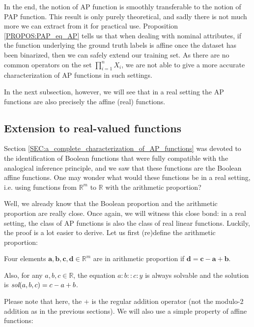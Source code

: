 In the end, the notion of AP function is smoothly transferable to the notion
of PAP function. This result is only purely theoretical, and sadly there is  
not much more we can extract from it for practical use. Proposition
\ref{PROPOS:PAP_eq_AP} tells us that when dealing with nominal attributes, if
the function underlying the ground truth labels is affine once the dataset has
been binarized, then we can safely extend our training set. As
there are no common operators on the set  $\prod_{i=1}^n X_i$, we are not able
to give a more accurate characterization of AP functions in such settings.

In the next subsection, however, we will see that in a real setting the AP
functions are also precisely the affine (real) functions.

\subsection{Extension to real-valued functions}
\label{SEC:extension_to_real_valued_functions}

Section \ref{SEC:a_complete_characterization_of_AP_functions} was devoted to the
identification of Boolean functions that were fully compatible with the
analogical inference principle, and we saw that
these functions are the Boolean affine functions. One may wonder what would
these functions be in a real setting, i.e. using functions  from $\mathbb{R}^m$
to $\mathbb{R}$ with the arithmetic proportion?

Well, we already know that the Boolean proportion and the arithmetic proportion
are really close. Once again, we will witness this close bond: in a real
setting, the class of AP functions is also the class of real linear functions.
Luckily, the proof is a lot easier to derive.  Let us first (re)define the
arithmetic proportion:
\begin{property}
  \label{PROPER:sol_arithm_prop}
  Four elements $\mathbf{a}, \mathbf{b}, \mathbf{c}, \mathbf{d} \in
  \mathbb{R}^m$ are in arithmetic proportion if $\mathbf{d} = \mathbf{c} -
  \mathbf{a} + \mathbf{b}$.

  Also, for any $a, b, c \in \mathbb{R}$, the equation $a : b :: c:y$ is always
  solvable and the solution is $\emph{sol}(a, b, c) = c - a + b$.
\end{property}

Please note that here, the $+$ is the regular addition operator (not the
modulo-2 addition as in the previous sections). We will also use a simple property of
affine functions:

